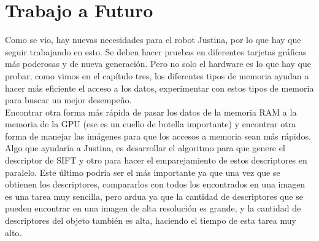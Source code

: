 \section{Trabajo a Futuro}
Como se vio, hay nuevas necesidades para el robot Justina, por lo que hay que seguir trabajando en esto. Se deben hacer pruebas en diferentes tarjetas gráficas más poderosas y de nueva generación. Pero no solo el hardware es lo que hay que probar, como vimos en el capítulo tres, los diferentes tipos de memoria ayudan a hacer más eficiente el acceso a los datos, experimentar con estos tipos de memoria para buscar un mejor desempeño.\\
Encontrar otra forma más rápida de pasar los datos de la memoria RAM a la memoria de la GPU (ese es un cuello de botella importante) y encontrar otra forma de manejar las imágenes para que los accesos a memoria sean más rápidos.\\
Algo que ayudaría a Justina, es desarrollar el algoritmo para que genere el descriptor de SIFT y otro para hacer el emparejamiento de estos descriptores en paralelo. Este último podría ser el más importante ya que una vez que se obtienen los descriptores, compararlos con todos los encontrados en una imagen es una tarea muy sencilla, pero ardua ya que la cantidad de descriptores que se pueden encontrar en una imagen de alta resolución es grande, y la cantidad de descriptores del objeto también es alta, haciendo el tiempo de esta tarea muy alto. \nocite{AIShack} \nocite{dicc}
